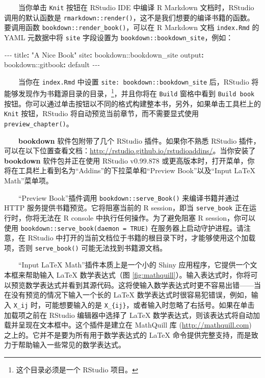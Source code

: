 \documentclass[
  12pt,
]{krantz}
\newenvironment{Shaded}{\begin{snugshade}}{\end{snugshade}}
\newcommand{\AttributeTok}[1]{\textcolor[rgb]{0.77,0.63,0.00}{#1}}
\newcommand{\FunctionTok}[1]{\textcolor[rgb]{0.00,0.00,0.00}{#1}}
\newcommand{\KeywordTok}[1]{\textcolor[rgb]{0.13,0.29,0.53}{\textbf{#1}}}
\newcommand{\PreprocessorTok}[1]{\textcolor[rgb]{0.56,0.35,0.01}{\textit{#1}}}
\newcommand{\StringTok}[1]{\textcolor[rgb]{0.31,0.60,0.02}{#1}}
\theoremstyle{definition}
\theoremstyle{definition}
\theoremstyle{definition}
\theoremstyle{definition}
\theoremstyle{remark}
\begin{document}
  当你单击 \texttt{Knit} 按钮在 RStudio IDE 中编译 R Markdown 文档时，RStudio 调用的默认函数是 \texttt{rmarkdown::render()}，这不是我们想要的编译书籍的函数。要调用函数 \texttt{bookdown::render\_book()}，可以在 R Markdown 文档 \texttt{index.Rmd} 的 YAML 元数据中将 \texttt{site} 字段设置为 \texttt{bookdown::bookdown\_site}，例如：

\begin{Shaded}
\begin{Highlighting}[]
\PreprocessorTok{{-}{-}{-}}
\FunctionTok{title}\KeywordTok{:}\AttributeTok{ }\StringTok{"A Nice Book"}
\FunctionTok{site}\KeywordTok{:}\AttributeTok{ bookdown::bookdown\_site}
\FunctionTok{output}\KeywordTok{:}
\AttributeTok{  bookdown:}\FunctionTok{:gitbook}\KeywordTok{:}\AttributeTok{ default}
\PreprocessorTok{{-}{-}{-}}
\end{Highlighting}
\end{Shaded}

  当你在 \texttt{index.Rmd} 中设置 \texttt{site:\ bookdown::bookdown\_site} 后，RStudio 将能够发现作为书籍源目录的目录，\footnote{这个目录必须是一个 RStudio 项目。}，并且你将在 \texttt{Build} 窗格中看到 \texttt{Build\ book} 按钮。你可以通过单击按钮以不同的格式构建整本书，另外，如果单击工具栏上的 \texttt{Knit} 按钮，RStudio 将自动预览当前章节，而不需要显式使用 \texttt{preview\_chapter()}。

  \textbf{bookdown} 软件包附带了几个 RStudio 插件。如果你不熟悉 RStudio 插件，可以在以下位置查看文档：\url{http://rstudio.github.io/rstudioaddins/}。当你安装了 \textbf{bookdown} 软件包并正在使用 RStudio v0.99.878 或更高版本时，打开菜单，你将在工具栏上看到名为``Addins''的下拉菜单和``Preview Book''以及``Input LaTeX Math''菜单项。

  ``Preview Book''插件调用 \texttt{bookdown::serve\_Book()} 来编译书籍并通过 HTTP 服务提供书籍预览。它将阻塞当前的 R session，即当 \texttt{serve\_book} 正在运行时，你将无法在 R console 中执行任何操作。为了避免阻塞 R session，你可以使用 \texttt{bookdown::serve\_book(daemon\ =\ TRUE)} 在服务器上启动守护进程。请注意，在 RStudio 中打开的当前文档位于书籍的根目录下时，才能够使用这个加载项，否则 \texttt{serve\_book()} 可能无法找到书籍源文档。

  ``Input LaTeX Math''插件本质上是一个小的 Shiny 应用程序，它提供一个文本框来帮助输入 LaTeX 数学表达式（图 \ref{fig:mathquill}）。输入表达式时，你将可以预览数学表达式并看到其源代码。这将使输入数学表达式时更不容易出错------当在没有预览的情况下输入一个长的 LaTeX 数学表达式时很容易犯错误，例如，输入 \texttt{X\_ij} 时，可能想要输入的是 \texttt{X\_\{ij\}}，或者输入时忽略了右括号。如果在单击加载项之前在 RStudio 编辑器中选择了 LaTeX 数学表达式，则该表达式将自动加载并呈现在文本框中。这个插件是建立在 MathQuill 库 (\url{http://mathquill.com}) 之上的。它并不是要为所有用于数学表达式的 LaTeX 命令提供完整支持，而是致力于帮助输入一些常见的数学表达式。
\end{document}
